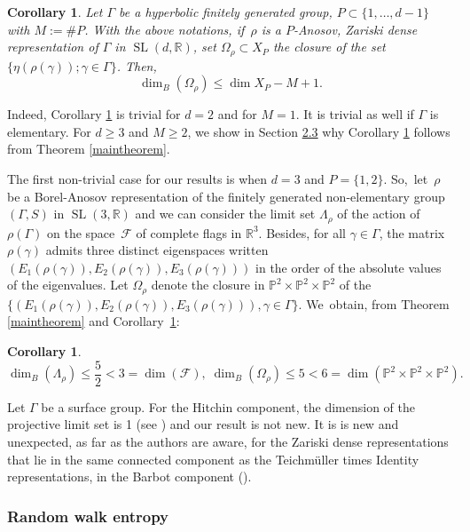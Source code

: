 \documentclass[10pt,a4paper]{amsart}
\newtheorem{corollary}[theorem]{Corollary}
\newcommand{\R}{\mathbb{R}}
\newcommand{\PP}{\mathbb{P}}
\newcommand{\F}{\mathcal{F}}
\let\G\Gamma
\let\g\gamma
\let\Om\Omega
\let\x\times
\DeclareMathOperator{\SL}{SL}
\begin{document}
\begin{corollary}\label{eigenvectors} Let \(\G\) be a hyperbolic finitely generated group, \hbox{\(P \!\subset\! \lbrace 1,\ldots, d-1 \rbrace\)} with \(M:= \# P \).
With the above notations, if~\(\rho \) is a \(P\)-Anosov, Zariski dense representation of \(\G\) in \(\SL(d,\R) \), set \(\Om_\rho \subset X_P \) the closure of the set \(\{ \eta (\rho (\g)); \g \in \G\}\). Then,
\[
\dim_B(\Om_\rho) \le \dim X_P -M +1.
\]
\end{corollary}

Indeed, Corollary \ref{eigenvectors} is trivial for \(d= 2\) and for \(M=1\). It is trivial as well if \(\G\) is elementary. For \(d \ge 3\) and \(M\ge 2\), we show in Section \href{https://jep.centre-mersenne.org/item/10.5802/jep.285.pdf#page=13}{2.3} why Corollary \ref{eigenvectors} follows from Theorem \ref{maintheorem}.

The first non-trivial case for our results is when \(d=3\) and \(P= \{1,2\}\). So,~let~\(\rho \) be a Borel-Anosov representation of the finitely generated non-elementary group \((\G, S)\) in \(\SL(3,\R) \) and we can consider the limit set \(\Lambda_\rho \) of the action of \(\rho(\G) \) on the space~\(\F\) of complete flags in \(\R^3\). Besides, for all \(\g \in \G\), the matrix \(\rho(\g)\) admits three distinct eigenspaces written \((E_1 (\rho(\g)), E_2 (\rho(\g)), E_3 (\rho(\g)))\) in the order of the absolute values of the eigenvalues. Let \(\Om_\rho \) denote the closure in \(\PP^2\x\PP^2\x\PP^2\) of the \(\{(E_1 (\rho(\g)), E_2 (\rho(\g)), E_3 (\rho(\g))), \g \in \G \} \). We~obtain, from Theorem \ref{maintheorem} and Corollary~\ref{eigenvectors}:

\skpt
\begin{corollary}\label{2.5, 5}\mbox{}\vspace*{-\baselineskip}
\[
\dim_B(\Lambda_\rho) \le \frac{5}{2} < 3 = \dim(\F), \; \dim_B(\Om_\rho) \le 5 < 6 = \dim (\PP^2\x\PP^2\x\PP^2).
\]
\end{corollary}
Let \(\G\) be a surface group. For the Hitchin component, the dimension of the projective limit set is 1 (see \cite{Lab06}) and our result is not new. It is is new and unexpected, as far as the authors are aware, for the Zariski dense representations that lie in the same connected component as the Teichmüller times Identity representations, \ie in the Barbot component (\cf \cite{barbot}).


\subsubsection{Random walk entropy}
\end{document}
